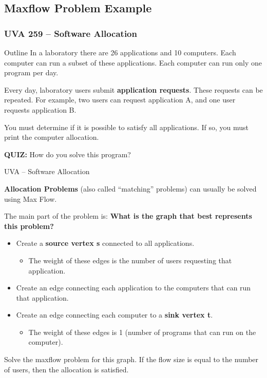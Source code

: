 \subsection{Maxflow Problem Example}
\begin{frame}
  \frametitle{UVA 259 -- Software Allocation}
    \begin{block}{Outline}
      In a laboratory there are 26 applications and 10 computers. Each computer can run a subset of these applications. Each computer can run only one program per day.\bigskip

      Every day, laboratory users submit {\bf application requests}. These requests can be repeated. For example, two users can request application A, and one user requests application B.

      You must determine if it is possible to satisfy all applications. If so, you must print the computer allocation.
    \end{block}

    \bigskip
    {\bf QUIZ:} How do you solve this program?
\end{frame}

\begin{frame}{UVA -- Software Allocation}

    {\bf Allocation Problems} (also called ``matching''
    problems) can usually be solved using Max Flow.
    \bigskip

    The main part of the problem is: {\bf What is the graph that best represents this problem?}

    \begin{itemize}
      \item Create a {\bf source vertex s} connected to all applications.
      \begin{itemize}
        \item The weight of these edges is the number of users requesting that application.
      \end{itemize}\medskip
      \item Create an edge connecting each application to the computers that can run that application.\medskip
      \item Create an edge connecting each computer to a {\bf sink vertex t}.
      \begin{itemize}
        \item The weight of these edges is 1 (number of programs that can run on the computer).
      \end{itemize}
    \end{itemize}\bigskip

    Solve the maxflow problem for this graph. If the flow size is equal to the number of users, then the allocation is satisfied.
\end{frame}

